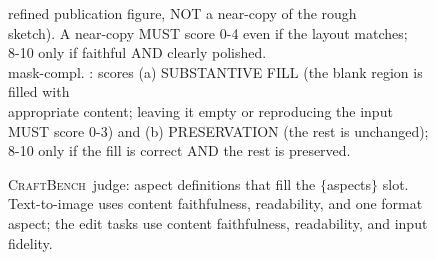 \documentclass{llmxive}
\providecommand{\CrafterBench}{\textsc{CraftBench}\xspace}
\begin{document}
\begin{figure}[t]
\begin{tcolorbox}
\hspace*{8.0em}refined publication figure, NOT a near-copy of the rough \\
\hspace*{8.0em}sketch). A near-copy MUST score 0-4 even if the layout matches; \\
\hspace*{8.0em}8-10 only if faithful AND clearly polished. \\
\hspace*{1.0em}mask-compl. : scores (a) SUBSTANTIVE FILL (the blank region is filled with \\
\hspace*{8.0em}appropriate content; leaving it empty or reproducing the input \\
\hspace*{8.0em}MUST score 0-3) and (b) PRESERVATION (the rest is unchanged); \\
\hspace*{8.0em}8-10 only if the fill is correct AND the rest is preserved.
\end{tcolorbox}
\caption{\CrafterBench\ judge: aspect definitions that fill the $\{$aspects$\}$ slot. Text-to-image uses content faithfulness, readability, and one format aspect; the edit tasks use content faithfulness, readability, and input fidelity.}
\label{fig:prompt-judge-aspects}
\end{figure}
\end{document}

